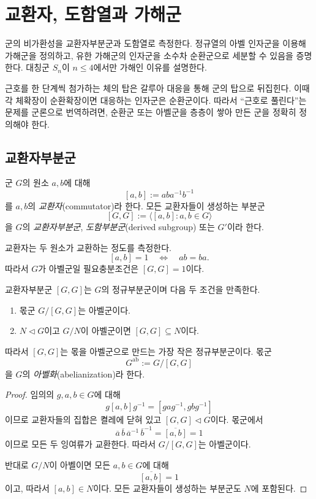 \clearpage
\section{교환자, 도함열과 가해군}
\label{sec:commutators-derived-series}

\begin{learninggoal}
군의 비가환성을 교환자부분군과 도함열로 측정한다. 정규열의 아벨 인자군을 이용해 가해군을 정의하고, 유한 가해군의 인자군을 소수차 순환군으로 세분할 수 있음을 증명한다. 대칭군 $S_n$이 $n\le4$에서만 가해인 이유를 설명한다.
\end{learninggoal}

근호를 한 단계씩 첨가하는 체의 탑은 갈루아 대응을 통해 군의 탑으로 뒤집힌다. 이때 각 체확장이 순환확장이면 대응하는 인자군은 순환군이다. 따라서 ``근호로 풀린다''는 문제를 군론으로 번역하려면, 순환군 또는 아벨군을 층층이 쌓아 만든 군을 정확히 정의해야 한다.

\subsection{교환자부분군}

\begin{definition}[교환자]
군 $G$의 원소 $a,b$에 대해
\[
  [a,b]:=aba^{-1}b^{-1}
\]
를 $a,b$의 \emph{교환자}(commutator)라 한다. 모든 교환자들이 생성하는 부분군
\[
  [G,G]:=\langle [a,b]:a,b\in G\rangle
\]
을 $G$의 \emph{교환자부분군}, \emph{도함부분군}(derived subgroup) 또는 $G'$이라 한다.
\end{definition}

교환자는 두 원소가 교환하는 정도를 측정한다.
\[
  [a,b]=1
  \quad\Longleftrightarrow\quad
  ab=ba.
\]
따라서 $G$가 아벨군일 필요충분조건은 $[G,G]=1$이다.

\begin{proposition}[아벨화의 보편 성질]
\label{prop:commutator-smallest-normal}
교환자부분군 $[G,G]$는 $G$의 정규부분군이며 다음 두 조건을 만족한다.
\begin{enumerate}[label=(\roman*)]
  \item 몫군 $G/[G,G]$는 아벨군이다.
  \item $N\triangleleft G$이고 $G/N$이 아벨군이면 $[G,G]\subseteq N$이다.
\end{enumerate}
따라서 $[G,G]$는 몫을 아벨군으로 만드는 가장 작은 정규부분군이다. 몫군
\[
  G^{\mathrm{ab}}:=G/[G,G]
\]
을 $G$의 \emph{아벨화}(abelianization)라 한다.
\end{proposition}

\begin{proof}
임의의 $g,a,b\in G$에 대해
\[
  g[a,b]g^{-1}=[gag^{-1},gbg^{-1}]
\]
이므로 교환자들의 집합은 켤레에 닫혀 있고 $[G,G]\triangleleft G$이다. 몫군에서
\[
  \overline a\,\overline b\,\overline a^{-1}\,\overline b^{-1}
  =\overline{[a,b]}=1
\]
이므로 모든 두 잉여류가 교환한다. 따라서 $G/[G,G]$는 아벨군이다.

반대로 $G/N$이 아벨이면 모든 $a,b\in G$에 대해
\[
  \overline{[a,b]}=1
\]
이고, 따라서 $[a,b]\in N$이다. 모든 교환자들이 생성하는 부분군도 $N$에 포함된다.
\end{proof}

